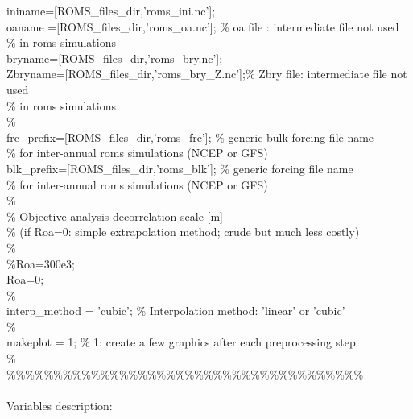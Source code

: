 ininame=[ROMS\_files\_dir,'roms\_ini.nc'];\\
oaname =[ROMS\_files\_dir,'roms\_oa.nc'];    \% oa file  : intermediate file not used\\
\%            in roms simulations\\
bryname=[ROMS\_files\_dir,'roms\_bry.nc'];\\
Zbryname=[ROMS\_files\_dir,'roms\_bry\_Z.nc'];\% Zbry file: intermediate file not used\\
\%            in roms simulations\\
\%\\
frc\_prefix=[ROMS\_files\_dir,'roms\_frc'];   \% generic bulk forcing file name \\
\% for inter-annual roms simulations (NCEP or GFS)\\
blk\_prefix=[ROMS\_files\_dir,'roms\_blk'];   \% generic forcing file name\\
\% for inter-annual roms simulations (NCEP or GFS)\\
\%\\
\% Objective analysis decorrelation scale [m]\\
\% (if Roa=0: simple extrapolation method; crude but much less costly)\\
\%\\
\%Roa=300e3;\\
Roa=0;\\
\%\\
interp\_method = 'cubic';           \% Interpolation method: 'linear' or 'cubic'\\
\%\\
makeplot     = 1;                 \% 1: create a few graphics after each preprocessing step\\
\%\\
\%\%\%\%\%\%\%\%\%\%\%\%\%\%\%\%\%\%\%\%\%\%\%\%\%\%\%\%\%\%\%\%\%\%\%\%\%\%\\
\\
Variables description:
